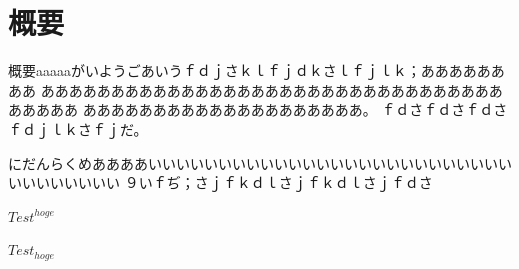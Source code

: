 \chapter{概要}
\thispagestyle{plain}
\label{abstract}

概要aaaaaがいようごあいうｆｄｊさｋｌｆｊｄｋさｌｆｊｌｋ；ああああああああ
ああああああああああああああああああああああああああああああああああああああ
ああああああああああああああああああああ。
ｆｄさｆｄさｆｄさｆｄｊｌｋさｆｊだ。

にだんらくめああああいいいいいいいいいいいいいいいいいいいいいいいいいいいいいいいいいい
９いｆぢ；さｊｆｋｄｌさｊｆｋｄｌさｊｆｄさ


$Test^{hoge}$

$Test_{hoge}$

